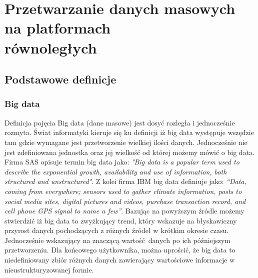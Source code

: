 \chapter{Przetwarzanie danych masowych na platformach\\równoległych} \label{chap.big-data-processing}

\section{Podstawowe definicje}
\subsection{Big data}
Definicja pojęcia Big data (dane masowe) jest dosyć rozległa i jednocześnie rozmyta. Świat informatyki kieruje się ku definicji iż big data występuje wszędzie tam gdzie wymagane jest przetworzenie wielkiej ilości danych. Jednocześnie nie jest zdefiniowana jednostka oraz jej wielkość od której możemy mówić o big data. Firma SAS opisuje termin big data jako: \newline \textit{"Big data is 
a  popular  term  used  to  describe  the  exponential  growth,  
availability  and  use  of  information,  both  structured  and  
unstructured"}. \newline Z kolei firma IBM big data definiuje jako: \textit{“Data, 
coming  from  everywhere;  sensors  used  to  gather  climate  
information,  posts  to  social  media  sites,  digital  pictures  
and  videos,  purchase  transaction  record,  and  cell  phone  
GPS signal to name a few”}.\cite{big_data_concept} Bazując na powyższym źródle możemy stwierdzić iż big data to zwyżkujący trend, który wskazuje na błyskawiczny przyrost danych pochodzących z różnych źródeł w krótkim okresie czasu. Jednocześnie wskazujący na znaczącą wartość danych po ich późniejszym przetworzeniu. Dla końcowego użytkownika, można uprościć, że big data to niedefiniowany zbiór różnych danych zawierający wartościowe informacje w nieustrukturyzowanej formie.
